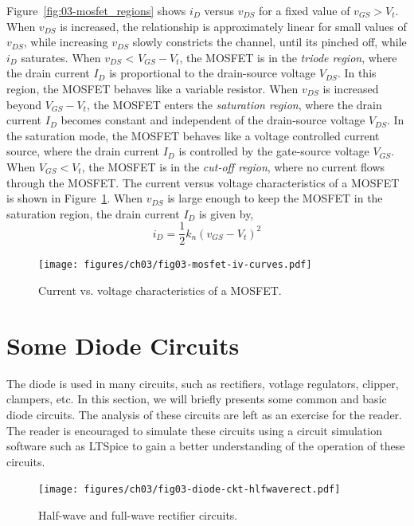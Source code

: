 Figure~\ref{fig:03-mosfet_regions} shows $i_D$ versus $v_{DS}$ for a fixed value of $v_{GS} > V_t$. When $v_{DS}$ is increased, the relationship is approximately linear for small values of $v_{DS}$, while increasing $v_{DS}$ slowly constricts the channel, until its pinched off, while $i_{D}$ saturates. When $v_{DS}$ < $V_{GS} - V_t$, the MOSFET is in the \textit{triode region}, where the drain current $I_D$ is proportional to the drain-source voltage $V_{DS}$. In this region, the MOSFET behaves like a variable resistor. When $v_{DS}$ is increased beyond $V_{GS} - V_t$, the MOSFET enters the \textit{saturation region}, where the drain current $I_D$ becomes constant and independent of the drain-source voltage $V_{DS}$. In the saturation mode, the MOSFET behaves like a voltage controlled current source, where the drain current $I_D$ is controlled by the gate-source voltage $V_{GS}$. When $V_{GS} < V_t$, the MOSFET is in the \textit{cut-off region}, where no current flows through the MOSFET. The current versus voltage characteristics of a MOSFET is shown in Figure~\ref{fig:03-mosfet-iv-curves}. When $v_{DS}$ is large enough to keep the MOSFET in the saturation region, the drain current $I_D$ is given by,
\begin{equation}
    i_D = \frac{1}{2}k_n\left(v_{GS} - V_t\right)^2
    \label{eq03-mosfet-id-sat}
\end{equation}

\begin{figure}[t]
    \centering
    \texttt{[image: figures/ch03/fig03-mosfet-iv-curves.pdf]}
    \caption{Current vs. voltage characteristics of a MOSFET.}
    \label{fig:03-mosfet-iv-curves}
\end{figure}

\section{Some Diode Circuits}
The diode is used in many circuits, such as rectifiers, votlage regulators, clipper, clampers, etc. In this section, we will briefly presents some common and basic diode circuits. The analysis of these circuits are left as an exercise for the reader. The reader is encouraged to simulate these circuits using a circuit simulation software such as LTSpice to gain a better understanding of the operation of these circuits.
\begin{figure}[b]
    \centering
    \texttt{[image: figures/ch03/fig03-diode-ckt-hlfwaverect.pdf]}
    \caption{Half-wave and full-wave rectifier circuits.}
    \label{fig:03-diode-ckt-hlfwaverect}
\end{figure}


